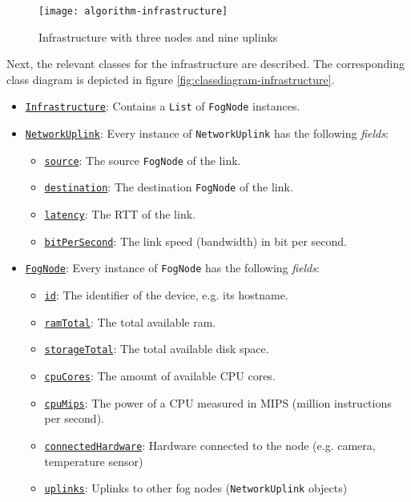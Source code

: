 \begin{figure}[htb]
    \centering
    \texttt{[image: algorithm-infrastructure]}
    \caption{Infrastructure with three nodes and nine uplinks}
    \label{fig:algorithm-infrastructure}
\end{figure}

Next, the relevant classes for the infrastructure are described. The corresponding class diagram is depicted in figure \ref{fig:classdiagram-infrastructure}.

\begin{itemize}
    \item \underline{\texttt{Infrastructure}}: Contains a \texttt{List} of \texttt{FogNode} instances.
    
    \item \underline{\texttt{NetworkUplink}}: Every instance of \texttt{NetworkUplink} has the following \textit{fields}:
    \begin{itemize}
        \item \underline{\texttt{source}}: The source \texttt{FogNode} of the link.
        \item \underline{\texttt{destination}}: The destination \texttt{FogNode} of the link.
        \item \underline{\texttt{latency}}: The RTT of the link.
        \item \underline{\texttt{bitPerSecond}}: The link speed (bandwidth) in bit per second.
    \end{itemize}

    \item \underline{\texttt{FogNode}}: Every instance of \texttt{FogNode} has the following \textit{fields}:
    \begin{itemize}
        \item \underline{\texttt{id}}: The identifier of the device, e.g. its hostname.
        \item \underline{\texttt{ramTotal}}: The total available ram.
        \item \underline{\texttt{storageTotal}}: The total available disk space.
        \item \underline{\texttt{cpuCores}}: The amount of available CPU cores.
        \item \underline{\texttt{cpuMips}}: The power of a CPU measured in MIPS (million instructions per second).
        \item \underline{\texttt{connectedHardware}}: Hardware connected to the node (e.g. camera, temperature sensor)
        \item \underline{\texttt{uplinks}}: Uplinks to other fog nodes (\texttt{NetworkUplink} objects)
    \end{itemize}
    

\end{itemize}
